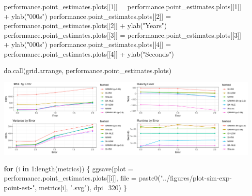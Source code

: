 \documentclass[
]{article}
\newenvironment{Shaded}{\begin{snugshade}}{\end{snugshade}}
\newcommand{\AttributeTok}[1]{\textcolor[rgb]{0.77,0.63,0.00}{#1}}
\newcommand{\ControlFlowTok}[1]{\textcolor[rgb]{0.13,0.29,0.53}{\textbf{#1}}}
\newcommand{\DecValTok}[1]{\textcolor[rgb]{0.00,0.00,0.81}{#1}}
\newcommand{\FunctionTok}[1]{\textcolor[rgb]{0.00,0.00,0.00}{#1}}
\newcommand{\NormalTok}[1]{#1}
\newcommand{\OtherTok}[1]{\textcolor[rgb]{0.56,0.35,0.01}{#1}}
\newcommand{\SpecialCharTok}[1]{\textcolor[rgb]{0.00,0.00,0.00}{#1}}
\newcommand{\StringTok}[1]{\textcolor[rgb]{0.31,0.60,0.02}{#1}}
\begin{document}
\begin{Shaded}
\begin{Highlighting}[]
\NormalTok{performance.point\_estimates.plots[[}\DecValTok{1}\NormalTok{]] }\OtherTok{=}\NormalTok{ performance.point\_estimates.plots[[}\DecValTok{1}\NormalTok{]] }\SpecialCharTok{+} \FunctionTok{ylab}\NormalTok{(}\StringTok{"000\textquotesingle{}s"}\NormalTok{)}
\NormalTok{performance.point\_estimates.plots[[}\DecValTok{2}\NormalTok{]] }\OtherTok{=}\NormalTok{ performance.point\_estimates.plots[[}\DecValTok{2}\NormalTok{]] }\SpecialCharTok{+} \FunctionTok{ylab}\NormalTok{(}\StringTok{"Years"}\NormalTok{)}
\NormalTok{performance.point\_estimates.plots[[}\DecValTok{3}\NormalTok{]] }\OtherTok{=}\NormalTok{ performance.point\_estimates.plots[[}\DecValTok{3}\NormalTok{]] }\SpecialCharTok{+} \FunctionTok{ylab}\NormalTok{(}\StringTok{"000\textquotesingle{}s"}\NormalTok{)}
\NormalTok{performance.point\_estimates.plots[[}\DecValTok{4}\NormalTok{]] }\OtherTok{=}\NormalTok{ performance.point\_estimates.plots[[}\DecValTok{4}\NormalTok{]] }\SpecialCharTok{+} \FunctionTok{ylab}\NormalTok{(}\StringTok{"Seconds"}\NormalTok{)}

\FunctionTok{do.call}\NormalTok{(grid.arrange, performance.point\_estimates.plots)}
\end{Highlighting}
\end{Shaded}

\includegraphics{sim_exp-results_files/figure-latex/unnamed-chunk-6-1.pdf}

\begin{Shaded}
\begin{Highlighting}[]
\ControlFlowTok{for}\NormalTok{ (i }\ControlFlowTok{in} \DecValTok{1}\SpecialCharTok{:}\FunctionTok{length}\NormalTok{(metrics)) \{}
  \FunctionTok{ggsave}\NormalTok{(}\AttributeTok{plot =}\NormalTok{ performance.point\_estimates.plots[[i]],}
         \AttributeTok{file =} \FunctionTok{paste0}\NormalTok{(}\StringTok{"../figures/plot{-}sim{-}exp{-}point{-}est{-}"}\NormalTok{, metrics[i], }\StringTok{".svg"}\NormalTok{),}
         \AttributeTok{dpi=}\DecValTok{320}\NormalTok{)}
\NormalTok{\}}
\end{Highlighting}
\end{Shaded}
\end{document}
